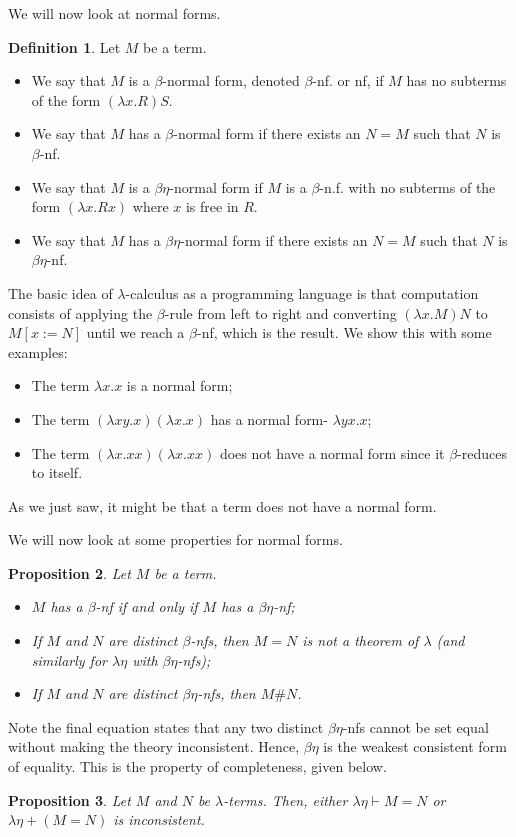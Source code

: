 \documentclass[a4paper, openany]{memoir}
\newtheorem{proposition}{Proposition}[section]
\theoremstyle{definition}
\newtheorem{definition}[proposition]{Definition}
\begin{document}
    We will now look at normal forms.
    \begin{definition}
        Let $M$ be a term.
        \begin{itemize}
            \item We say that $M$ is a $\beta$-normal form, denoted $\beta$-nf. or nf, if $M$ has no subterms of the form $(\lambda x.R)S$.
            \item We say that $M$ has a $\beta$-normal form if there exists an $N = M$ such that $N$ is $\beta$-nf.
            \item We say that $M$ is a $\beta \eta$-normal form if $M$ is a $\beta$-n.f. with no subterms of the form $(\lambda x.Rx)$ where $x$ is free in $R$.
            \item We say that $M$ has a $\beta \eta$-normal form if there exists an $N = M$ such that $N$ is $\beta \eta$-nf.
        \end{itemize}
    \end{definition}
    The basic idea of $\lambda$-calculus as a programming language is that computation consists of applying the $\beta$-rule from left to right and converting $(\lambda x.M)N$ to $M[x := N]$ until we reach a $\beta$-nf, which is the result. We show this with some examples:
    \begin{itemize}
        \item The term $\lambda x.x$ is a normal form;
        \item The term $(\lambda xy.x)(\lambda x.x)$ has a normal form- $\lambda yx.x$;
        \item The term $(\lambda x.xx)(\lambda x.xx)$ does not have a normal form since it $\beta$-reduces to itself.
    \end{itemize}
    As we just saw, it might be that a term does not have a normal form.

    We will now look at some properties for normal forms.
    \begin{proposition}
        Let $M$ be a term.
        \begin{itemize}
            \item $M$ has a $\beta$-nf if and only if $M$ has a $\beta \eta$-nf;
            \item If $M$ and $N$ are distinct $\beta$-nfs, then $M = N$ is not a theorem of $\lambda$ (and similarly for $\lambda \eta$ with $\beta \eta$-nfs);
            \item If $M$ and $N$ are distinct $\beta \eta$-nfs, then $M \# N$.
        \end{itemize}
    \end{proposition}
    \noindent Note the final equation states that any two distinct $\beta \eta$-nfs cannot be set equal without making the theory inconsistent. Hence, $\beta \eta$ is the weakest consistent form of equality. This is the property of completeness, given below.
    \begin{proposition}
        Let $M$ and $N$ be $\lambda$-terms. Then, either $\lambda \eta \vdash M = N$ or $\lambda \eta + (M = N)$ is inconsistent.
    \end{proposition}
    
\end{document}
